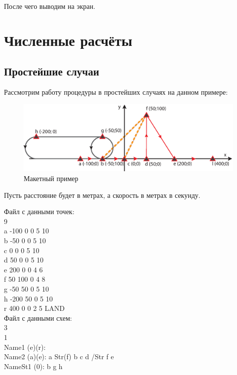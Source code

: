 \documentclass[12pt, a4 paper]{article}
\theoremstyle{plain}
\begin{document}
После чего выводим на экран.

\newpage

\section{Численные расчёты}
\subsection{Простейшие случаи}

Рассмотрим работу процедуры в простейших случаях на данном примере:

\begin{figure}[h]
  \begin{center}
      \includegraphics[scale=1]{Example.eps}
        \caption{Макетный пример}                                                                             
  \end{center}
\end{figure}

Пусть расстояние будет в метрах, а скорость в метрах в секунду.

\noindent Файл с данными точек:\\
9\\
a -100 0 0 5 10\\
b -50 0 0 5 10\\
c 0 0 0 5 10\\
d 50 0 0 5 10\\
e 200 0 0 4 6\\
f 50 100 0 4 8\\
g -50 50 0 5 10\\
h -200 50 0 5 10\\
r 400 0 0 2 5 LAND\\

\noindent Файл с данными схем:\\
3\\
1\\
Name1 (e)(r):\\
Name2 (a)(e): a Str(f) b c d /Str f e\\
NameSt1 (0): b g h\\
\end{document}
